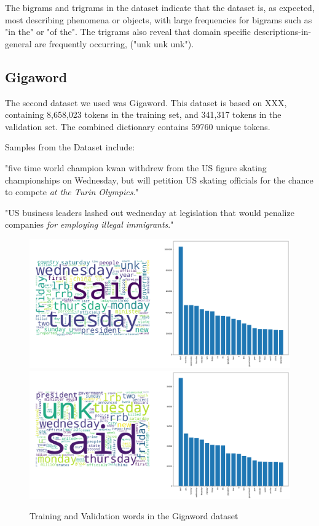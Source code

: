 \documentclass[a4paper]{article}
\begin{document}
The bigrams and trigrams in the dataset indicate that the dataset is, as expected,
most describing phenomena or objects, with large frequencies for bigrams
such as "in the" or "of the". The trigrams also reveal that domain specific
descriptions-in-general are frequently occurring, ("unk unk unk").

\subsection{Gigaword}
\label{sec:gigaword}

The second dataset we used was Gigaword. This dataset is based on XXX,
containing 8,658,023 tokens in the training set, and 341,317 tokens in the
validation set. The combined dictionary contains 59760 unique tokens.

Samples from the Dataset include:

"five time world champion kwan withdrew from the US figure skating championships
on Wednesday, but will petition US skating officials for the chance to compete
\emph{at the Turin Olympics}."

"US business leaders lashed out wednesday at legislation that would penalize companies
\emph{for employing illegal immigrants}."

\begin{figure}[!ht]
\includegraphics[width=0.8\columnwidth]{sr-eda-gigaword-train-words}
\includegraphics[width=0.8\columnwidth]{sr-eda-gigaword-valid-words}
\centering
\caption{Training and Validation words in the Gigaword dataset}
\end{figure}
\end{document}

